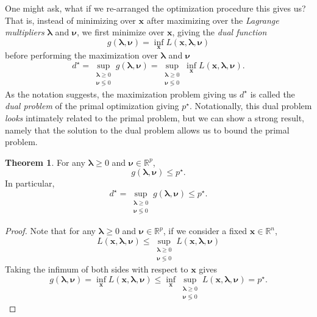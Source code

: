 \documentclass[10pt,letterpaper]{article}
\theoremstyle{definition}
\newtheorem{theorem}{Theorem}[section]
\theoremstyle{remark}
\newcommand\R{\mathbb{R}}
\newcommand\x{\boldsymbol{x}}
\newcommand\lambdab{\boldsymbol{\lambda}}
\newcommand\nub{\boldsymbol{\nu}}
\begin{document}
One might ask, what if we re-arranged the optimization procedure this gives us? That is,
instead of minimizing over $\x$ after maximizing over the \emph{Lagrange multipliers} $\lambdab$
and $\nub$, we first minimize over $\x$, giving the \emph{dual function}
\[
    g(\lambdab,\nub) = \inf_{\x}L(\x,\lambdab,\nub)
\]
before performing the maximization over $\lambdab$ and $\nub$
\[
    d^\star = \sup_{\substack{\lambdab\geq 0\\\nub\lessgtr 0}} g(\lambdab,\nub) = \sup_{\substack{\lambdab\geq 0\\\nub\lessgtr 0}}\inf_{\x} L(\x,\lambdab,\nub).
\]
As the notation suggests, the maximization problem giving us $d^\star$ is called the \emph{dual problem}
of the primal optimization giving $p^\star$. Notationally, this dual problem \emph{looks} intimately related
to the primal problem, but we can show a strong result, namely that the solution to the dual problem
allows us to bound the primal problem.

\begin{theorem}
    For any $\lambdab \geq 0$ and $\nub\in\R^p$, $$g(\lambdab,\nub) \leq p^\star.$$ In particular,
    $$d^\star = \sup_{\substack{\lambdab \geq 0\\\nub\lessgtr 0}}g(\lambdab,\nub) \leq p^\star.$$
\end{theorem}
\begin{proof}
    Note that for any $\lambdab\geq 0$ and $\nub\in\R^p$, if we consider a fixed $\x\in\R^n$,
    \[
        L(\x,\lambdab,\nub) \leq \sup_{\substack{\lambdab\geq 0\\\nub\lessgtr 0}} L(\x,\lambdab,\nub)
    \]
    Taking the infimum of both sides with respect to $\x$ gives
    \[
        g(\lambdab,\nub) = \inf_{\x} L(\x,\lambdab,\nub) \leq \inf_{\x} \sup_{\substack{\lambdab\geq 0\\\nub\lessgtr 0}} L(\x,\lambdab,\nub) = p^\star.
    \]
\end{proof}
\end{document}
